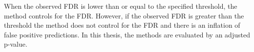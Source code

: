 When the observed FDR is lower than or equal to the specified threshold, the method controls for the FDR. However, if the observed FDR is greater than the threshold the method does not control for the FDR and there is an inflation of false positive predictions. In this thesis, the methods are evaluated by an adjusted p-value.
